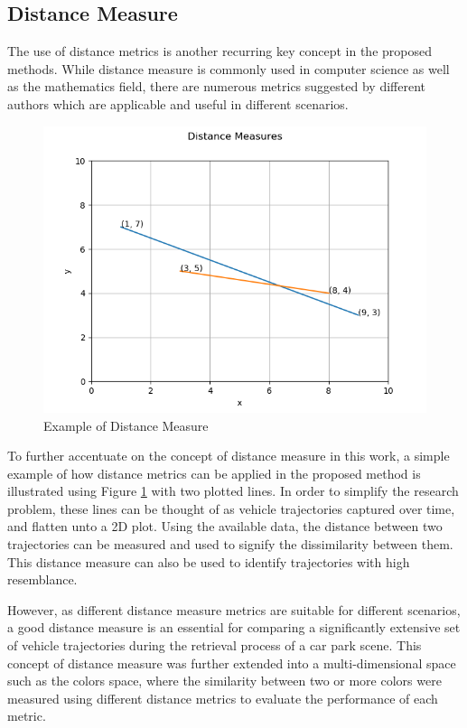 \subsection{Distance Measure}
\label{section:distancemeasures}

The use of distance metrics is another recurring key concept in the proposed methods. While distance measure is commonly used in computer science as well as the mathematics field, there are numerous metrics suggested by different authors which are applicable and useful in different scenarios. 

\begin{figure}[hbt!]\centering
\includegraphics[width=.7\textwidth]{image/general/distance.png}
\caption{Example of Distance Measure}
\label{fig:distanceMeasure}
\end{figure}

To further accentuate on the concept of distance measure in this work, a simple example of how distance metrics can be applied in the proposed method is illustrated using Figure \ref{fig:distanceMeasure} with two plotted lines. In order to simplify the research problem, these lines can be thought of as vehicle trajectories captured over time, and flatten unto a 2D plot. Using the available data, the distance between two trajectories can be measured and used to signify the dissimilarity between them. This distance measure can also be used to identify trajectories with high resemblance. 

However, as different distance measure metrics are suitable for different scenarios, a good distance measure is an essential for comparing a significantly extensive set of vehicle trajectories during the retrieval process of a car park scene. This concept of distance measure was further extended into a multi-dimensional space such as the colors space, where the similarity between two or more colors were measured using different distance metrics to evaluate the performance of each metric. 




